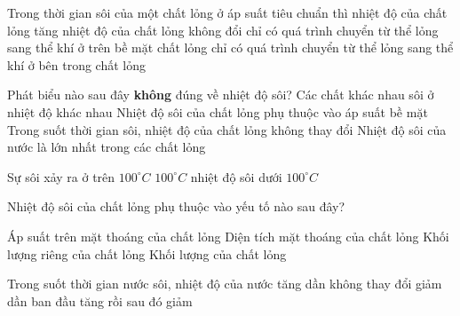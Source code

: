 \begin{ex}
	Trong thời gian sôi của một chất lỏng ở áp suất tiêu chuẩn thì
	\choice
	{nhiệt độ của chất lỏng tăng}
	{\True nhiệt độ của chất lỏng không đổi}
	{chỉ có quá trình chuyển từ thể lỏng sang thể khí ở trên bề mặt chất lỏng}
	{chỉ có quá trình chuyển từ thể lỏng sang thể khí ở bên trong chất lỏng}
	\end{ex}

\begin{ex}
	Phát biểu nào sau đây \textbf{không} đúng về nhiệt độ sôi?
	\choice
	{Các chất khác nhau sôi ở nhiệt độ khác nhau}
	{Nhiệt độ sôi của chất lỏng phụ thuộc vào áp suất bề mặt}
	{Trong suốt thời gian sôi, nhiệt độ của chất lỏng không thay đổi}
	{\True Nhiệt độ sôi của nước là lớn nhất trong các chất lỏng}
	\end{ex}


\begin{ex}
	Sự sôi xảy ra ở
	\choice
	{trên $100^\circ C$}
	{$100^\circ C$}
	{\True nhiệt độ sôi}
	{dưới $100^\circ C$}
	\end{ex}

\begin{ex}
	Nhiệt độ sôi của chất lỏng phụ thuộc vào yếu tố nào sau đây?
	
	\choice
	{\True Áp suất trên mặt thoáng của chất lỏng}
	{Diện tích mặt thoáng của chất lỏng}
	{Khối lượng riêng của chất lỏng}
	{Khối lượng của chất lỏng}
	\end{ex}

\begin{ex}
	Trong suốt thời gian nước sôi, nhiệt độ của nước
	\choice
	{tăng dần}
	{\True không thay đổi}
	{giảm dần}
	{ban đầu tăng rồi sau đó giảm}
	\end{ex}

